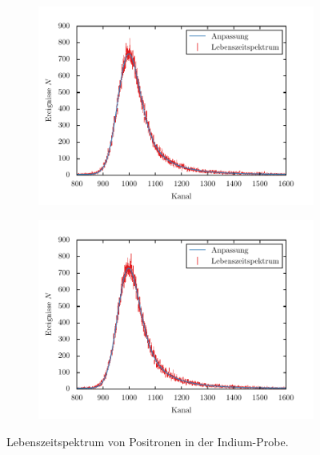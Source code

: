 \documentclass[11pt, a4paper]{article}
\numberwithin{equation}{section}
\begin{document}
\begin{appendix}
\begin{figure}
	\begin{subfigure}{\textwidth}
		\centering
		\includegraphics{./figures/lifetimes/77_grad.pdf}
	\end{subfigure}
	\begin{subfigure}{\textwidth}
		\centering
		\includegraphics{./figures/lifetimes/88_grad.pdf}
	\end{subfigure}
	\caption{Lebenszeitspektrum von Positronen in der Indium-Probe.}
\end{figure}


\end{appendix}
\end{document}
